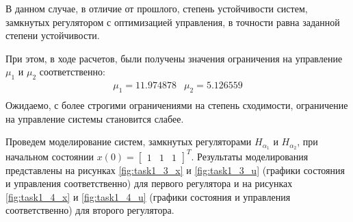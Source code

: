 В данном случае, в отличие от прошлого, степень устойчивости систем, замкнутых 
регулятором с оптимизацией управления, в точности равна заданной степени устойчивости. 

При этом, в ходе расчетов, были получены значения ограничения на управление $\mu_1$ и $\mu_2$ 
соответственно: 
\begin{equation}
    \begin{array}{cc}
        \mu_1 = 11.974878 & \mu_2 = 5.126559 \\  
    \end{array}
\end{equation}
Ожидаемо, с более строгими ограничениями на степень сходимости, ограничение на 
управление системы становится слабее. 

Проведем моделирование систем, замкнутых регуляторами $H_{\alpha_1}$ и $H_{\alpha_2}$,
при начальном состоянии $x(0) = \begin{bmatrix}1 & 1 & 1\end{bmatrix}^T$.
Результаты моделирования представлены на рисунках \ref{fig:task1_3_x} и \ref{fig:task1_3_u} 
(графики состояния и управления соответственно) для первого регулятора и на рисунках \ref{fig:task1_4_x} и \ref{fig:task1_4_u} 
(графики состояния и управления соответственно) для второго регулятора.

